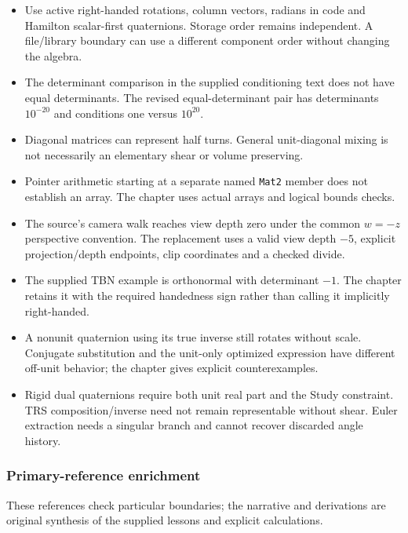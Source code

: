 \begin{itemize}
\tightlist
\item
  Use active right-handed rotations, column vectors, radians in code and Hamilton scalar-first quaternions. Storage order remains independent. A file/library boundary can use a different component order without changing the algebra.
\item
  The determinant comparison in the supplied conditioning text does not have equal determinants. The revised equal-determinant pair has determinants \(10^{-20}\) and conditions one versus \(10^{20}\).
\item
  Diagonal matrices can represent half turns. General unit-diagonal mixing is not necessarily an elementary shear or volume preserving.
\item
  Pointer arithmetic starting at a separate named \texttt{Mat2} member does not establish an array. The chapter uses actual arrays and logical bounds checks.
\item
  The source's camera walk reaches view depth zero under the common \(w=-z\) perspective convention. The replacement uses a valid view depth \(-5\), explicit projection/depth endpoints, clip coordinates and a checked divide.
\item
  The supplied TBN example is orthonormal with determinant \(-1\). The chapter retains it with the required handedness sign rather than calling it implicitly right-handed.
\item
  A nonunit quaternion using its true inverse still rotates without scale. Conjugate substitution and the unit-only optimized expression have different off-unit behavior; the chapter gives explicit counterexamples.
\item
  Rigid dual quaternions require both unit real part and the Study constraint. TRS composition/inverse need not remain representable without shear. Euler extraction needs a singular branch and cannot recover discarded angle history.
\end{itemize}

\subsubsection{Primary-reference enrichment}\label{appendix-a103e7846d21-primary-reference-enrichment}

These references check particular boundaries; the narrative and derivations are original synthesis of the supplied lessons and explicit calculations.

